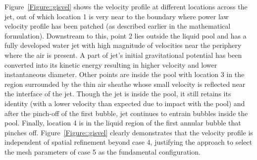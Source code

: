 Figure~\ref{Figure::gisvel} shows the velocity profile at different locations across the jet, out of which location 1 is very near to the boundary where power law velocity profile has been patched (as described earlier in the mathematical formulation). Downstream to this, point 2 lies outside the liquid pool and has a fully developed water jet with high magnitude of velocities near the periphery where the air is present. A part of jet's initial gravitational potential has been converted into its kinetic energy resulting in higher velocity and lower instantaneous diameter. Other points are inside the pool with location 3 in the region surrounded by the thin air sheathe whose small velocity is reflected near the interface of the jet. Though the jet is inside the pool, it still retains its identity (with a lower velocity than expected due to impact with the pool) and after the pinch-off of the first bubble, jet continues to entrain bubbles inside the pool. Finally, location 4 is in the liquid region of the first annular bubble that pinches off. Figure~\ref{Figure::gisvel} clearly demonstrates that the velocity profile is independent of spatial refinement beyond case 4, justifying the approach to select the mesh parameters of case 5 as the fundamental configuration.
